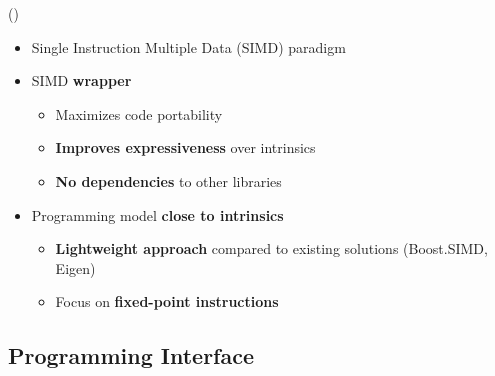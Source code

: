 \begin{frame}{\longMIPP (\MIPP)}
  \vspace{0.1cm}
  \begin{itemize}
    \item<2-> Single Instruction Multiple Data (SIMD) paradigm
    \item<3-> SIMD \textbf{\Cxx wrapper}
    \begin{itemize}
      \item<3-> Maximizes code portability
      \item<3-> \textbf{Improves expressiveness} over intrinsics
      \item<3-> \textbf{No dependencies} to other libraries
    \end{itemize}
    \item<4-> Programming model \textbf{close to intrinsics}
    \begin{itemize}
      \item<4-> \textbf{Lightweight approach} compared to existing solutions (Boost.SIMD, Eigen)
      \item<4-> Focus on \textbf{fixed-point instructions}
    \end{itemize}
  \end{itemize}
  \vfill
\end{frame}

\subsection[Programming Interface]{Programming Interface}

